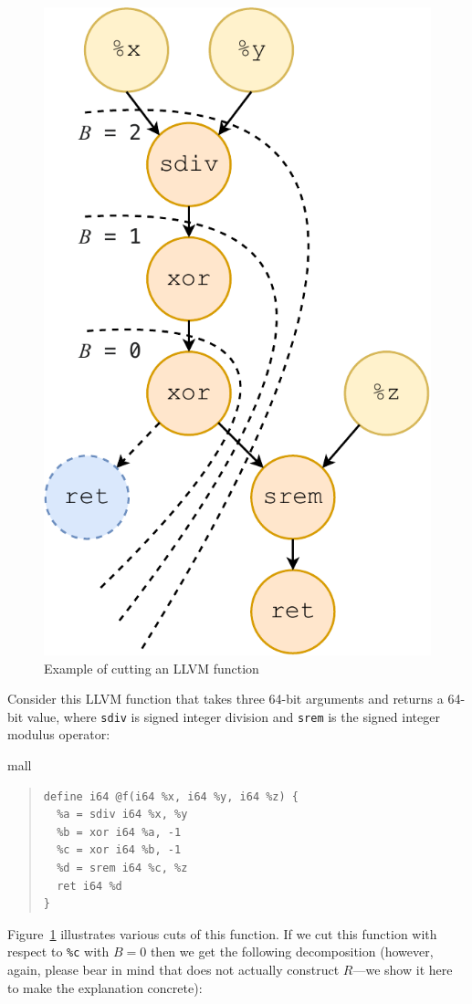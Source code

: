 \begin{figure}[tbp]
  \centering
  \includegraphics[width=0.6\linewidth]{figures/cut-depth.pdf}
  \caption{Example of cutting an LLVM function}
  \label{fig:cut-depth}
\end{figure}

Consider this LLVM function that takes three 64-bit arguments and
returns a 64-bit value, where \texttt{sdiv} is signed integer division
and \texttt{srem} is the signed integer modulus operator:


{mall\begin{quote}
\begin{verbatim}
define i64 @f(i64 %x, i64 %y, i64 %z) {
  %a = sdiv i64 %x, %y
  %b = xor i64 %a, -1
  %c = xor i64 %b, -1
  %d = srem i64 %c, %z
  ret i64 %d
}
\end{verbatim}
\end{quote}}

Figure~\ref{fig:cut-depth} illustrates various cuts of this function.
%
If we cut this function with respect to \texttt{\%c} with $B = 0$ then
we get the following decomposition (however, again, please bear in
mind that \minotaur{} does not actually construct $R$---we show it here to
make the explanation concrete):

